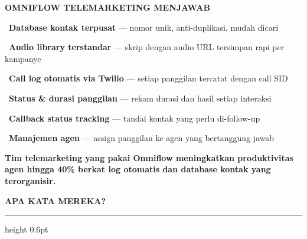 \documentclass[a4paper]{article}
\newcommand{\sectiontitle}[1]{%
    \vspace{10pt}%
    {\fontsize{13}{16}\selectfont\bfseries\color{BlueDark} #1}\par\vspace{3pt}%
    {\color{BluePrimary}\hrule height 0.6pt}\par\vspace{8pt}%
}
\begin{document}
\begin{minipage}[t]{0.485\textwidth}
    \colorbox{CrimsonPrimary}{%
        \begin{minipage}{\dimexpr\textwidth-2\fboxsep\relax}
            {\fontsize{10}{13}\selectfont\bfseries\color{White} OMNIFLOW TELEMARKETING MENJAWAB}
        \end{minipage}}\par
    \vspace{4pt}

    {\fontsize{9.5}{13}\selectfont\color{TextDark}%
    \textbullet\ \textbf{Database kontak terpusat} --- nomor unik, anti-duplikasi, mudah dicari\par\vspace{4pt}%
    \textbullet\ \textbf{Audio library terstandar} --- skrip dengan audio URL tersimpan rapi per kampanye\par\vspace{4pt}%
    \textbullet\ \textbf{Call log otomatis via Twilio} --- setiap panggilan tercatat dengan call SID\par\vspace{4pt}%
    \textbullet\ \textbf{Status \& durasi panggilan} --- rekam durasi dan hasil setiap interaksi\par\vspace{4pt}%
    \textbullet\ \textbf{Callback status tracking} --- tandai kontak yang perlu di-follow-up\par\vspace{4pt}%
    \textbullet\ \textbf{Manajemen agen} --- assign panggilan ke agen yang bertanggung jawab}%
\end{minipage}

\vspace{8pt}

{\setlength{\fboxsep}{7pt}\setlength{\fboxrule}{0pt}%
\noindent\colorbox{CrimsonPrimary}{%
    \begin{minipage}{\dimexpr\textwidth-2\fboxsep\relax}
        \centering
        {\fontsize{9.5}{12}\selectfont\bfseries\color{White}
        Tim telemarketing yang pakai Omniflow meningkatkan \textbf{produktivitas agen hingga 40\%} berkat log otomatis dan database kontak yang terorganisir.}
    \end{minipage}}}

\vspace{8pt}
\sectiontitle{APA KATA MEREKA?}
\end{document}
